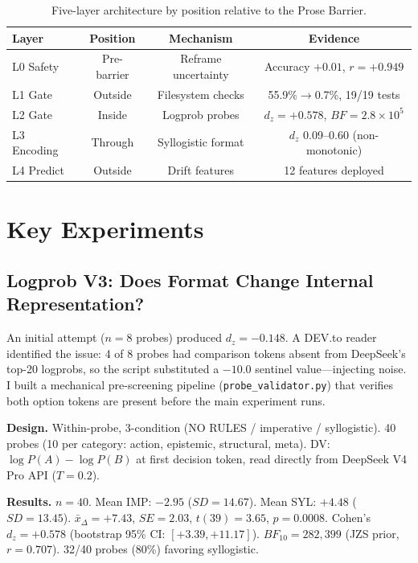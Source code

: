 \documentclass[11pt]{article}
\begin{document}
\begin{table}[t]
\centering
\begin{tabular}{lccc}
\toprule
\textbf{Layer} & \textbf{Position} & \textbf{Mechanism} & \textbf{Evidence} \\
\midrule
L0 Safety  & Pre-barrier & Reframe uncertainty   & Accuracy $+0.01$, $r{=}+0.949$ \\
L1 Gate     & Outside     & Filesystem checks     & 55.9\%$\to$0.7\%, 19/19 tests \\
L2 Gate     & Inside      & Logprob probes        & $d_z{=}+0.578$, $BF{=}2.8{\times}10^5$ \\
L3 Encoding & Through     & Syllogistic format    & $d_z$ 0.09--0.60 (non-monotonic) \\
L4 Predict  & Outside     & Drift features        & 12 features deployed \\
\bottomrule
\end{tabular}
\caption{Five-layer architecture by position relative to the Prose Barrier.}
\label{tab:architecture}
\end{table}

\section{Key Experiments}

\subsection{Logprob V3: Does Format Change Internal Representation?}
\label{sec:v3}

An initial attempt ($n=8$ probes) produced $d_z = -0.148$. A DEV.to reader
identified the issue: 4 of 8 probes had comparison tokens absent from DeepSeek's
top-20 logprobs, so the script substituted a $-10.0$ sentinel value---injecting
noise. I built a mechanical pre-screening pipeline (\texttt{probe\_validator.py})
that verifies both option tokens are present before the main experiment runs.

\textbf{Design.} Within-probe, 3-condition (NO RULES / imperative / syllogistic).
40 probes (10 per category: action, epistemic, structural, meta). DV: $\log P(A)
- \log P(B)$ at first decision token, read directly from DeepSeek V4 Pro API
($T=0.2$).

\textbf{Results.} $n=40$. Mean IMP: $-2.95$ ($SD=14.67$). Mean SYL: $+4.48$
($SD=13.45$). $\bar{x}_{\Delta} = +7.43$, $SE=2.03$, $t(39)=3.65$, $p=0.0008$.
Cohen's $d_z = +0.578$ (bootstrap 95\% CI: $[+3.39, +11.17]$). $BF_{10} =
282{,}399$ (JZS prior, $r=0.707$). 32/40 probes (80\%) favoring syllogistic.
\end{document}
